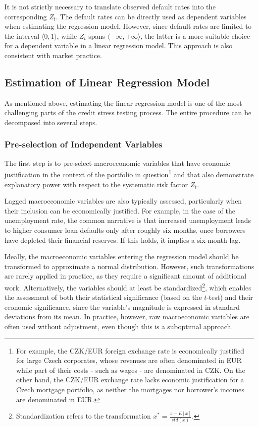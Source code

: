 \documentclass[11pt,a4paper]{article}
\begin{document}
It is not strictly necessary to translate observed default rates into the corresponding $Z_t$. The default rates can be directly used as dependent variables when estimating the regression model. However, since default rates are limited to the interval $\langle 0,1 \rangle$, while $Z_t$ spans $\langle -\infty, +\infty \rangle$, the latter is a more suitable choice for a dependent variable in a linear regression model. This approach is also consistent with market practice.

\subsection{Estimation of Linear Regression Model}

As mentioned above, estimating the linear regression model is one of the most challenging parts of the credit stress testing process. The entire procedure can be decomposed into several steps.

\subsubsection{Pre-selection of Independent Variables}

The first step is to pre-select macroeconomic variables that have economic justification in the context of the portfolio in question\footnote{For example, the CZK/EUR foreign exchange rate is economically justified for large Czech corporates, whose revenues are often denominated in EUR while part of their costs - such as wages - are denominated in CZK. On the other hand, the CZK/EUR exchange rate lacks economic justification for a Czech mortgage portfolio, as neither the mortgages nor borrower's incomes are denominated in EUR.} and that also demonstrate explanatory power with respect to the systematic risk factor $Z_t$.

Lagged macroeconomic variables are also typically assessed, particularly when their inclusion can be economically justified. For example, in the case of the unemployment rate, the common narrative is that increased unemployment leads to higher consumer loan defaults only after roughly six months, once borrowers have depleted their financial reserves. If this holds, it implies a six-month lag.

Ideally, the macroeconomic variables entering the regression model should be transformed to approximate a normal distribution. However, such transformations are rarely applied in practice, as they require a significant amount of additional work. Alternatively, the variables should at least be standardized\footnote{Standardization refers to the transformation $x^*=\frac{x - E[x]}{std(x)}$.}, which enables the assessment of both their statistical significance (based on the $t$-test) and their economic significance, since the variable's magnitude is expressed in standard deviations from its mean. In practice, however, raw macroeconomic variables are often used without adjustment, even though this is a suboptimal approach.
\end{document}
